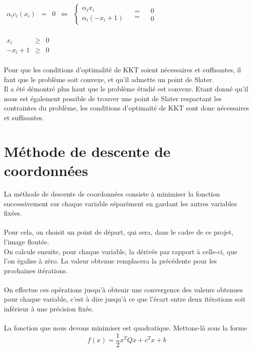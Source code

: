 \documentclass[12pt, a4paper]{report}
\begin{document}
\begin{center}
$\begin{array}{rclcrll}
\alpha_i c_i(x_i) & = & 0 & \Leftrightarrow & \left\{\begin{array}{l} \alpha_i x_i \\ \alpha_i(- x_i +1)\end{array}\right. & \begin{array}{c} = \\ = \end{array} & \begin{array}{l} 0 \\ 0 \end{array}\\
\end{array}$
\end{center}

\begin{center}
$\begin{array}{rcl}
x_i & \geq & 0 \\
-x_i + 1 & \geq & 0 \\
\end{array}$
\end{center}
\noindent
Pour que les conditions d'optimalité de KKT soient nécessaires et suffisantes, il faut que le problème soit convexe, et qu'il admette un point de Slater.\\
Il a été démontré plus haut que le problème étudié est convexe. Etant donné qu'il nous est également possible de trouver une point de Slater respactant les contraintes du problème, les conditions d'optimaité de KKT sont donc nécessaires et suffisantes.

\section{Méthode de descente de coordonnées}
La méthode de descente de coordonnées consiste à minimiser la fonction successivement sur chaque variable séparément en gardant les autres variables fixées.\\
\\Pour cela, on choisit un point de départ, qui sera, dans le cadre de ce projet, l'image floutée.\\
On calcule ensuite, pour chaque variable, la dérivée par rapport à celle-ci, que l'on égalise à zéro. La valeur obtenue remplacera la précédente pour les prochaines itérations. \\
\\On effectue ces opérations jusqu'à obtenir une convergence des valeurs obtenues pour chaque variable, c'est à dire jusqu'à ce que l'écart entre deux itérations soit inférieur à une précision fixée. \\
\\La fonction que nous devons minimiser est quadratique. Mettons-là sous la forme \[f(x) = \dfrac{1}{2}x^TQx + c^Tx + b\]
\end{document}
